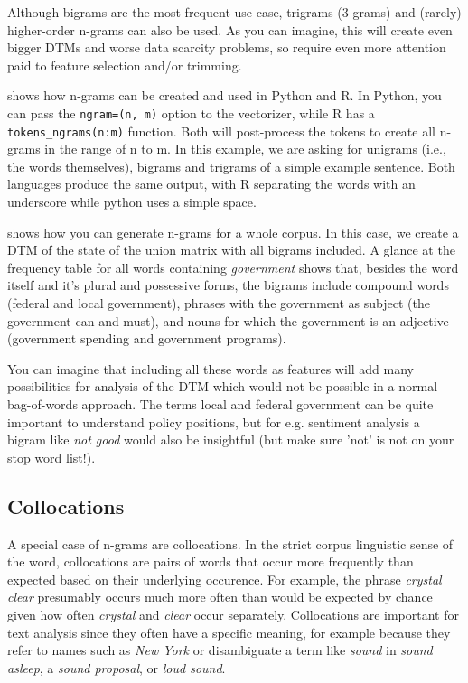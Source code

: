 Although bigrams are the most frequent use case, trigrams (3-grams) and (rarely) higher-order n-grams can also be used.
As you can imagine, this will create even bigger DTMs and worse data scarcity problems,
so require even more attention paid to feature selection and/or trimming.



 shows how n-grams can be created and used in Python and R.
In Python, you can pass the \verb|ngram=(n, m)| option to the vectorizer,
while R has a \verb|tokens_ngrams(n:m)| function.
Both will post-process the tokens to create all n-grams in the range of n to m.
In this example, we are asking for unigrams (i.e., the words themselves), bigrams and trigrams of a simple example sentence.
Both languages produce the same output, with R separating the words with an underscore while python uses a simple space.


 shows how you can generate n-grams for a whole corpus.
In this case, we create a DTM of the state of the union matrix with all bigrams included.
A glance at the frequency table for all words containing \emph{government} shows that,
besides the word itself and it's plural and possessive forms, the bigrams include compound words (federal and local government),
phrases with  the government as subject (the government can and must), and nouns for which the government is an adjective
(government spending and government programs).

You can imagine that including all these words as features will add many possibilities for analysis of the DTM
which would not be possible in a normal bag-of-words approach.
The terms local and federal government can be quite important to understand policy positions,
but for e.g. sentiment analysis a bigram like \emph{not good} would also be insightful
(but make sure 'not' is not on your stop word list!).   

\subsection{Collocations}

A special case of n-grams are collocations.
In the strict corpus linguistic sense of the word, collocations are pairs of words that occur more frequently than expected
based on their underlying occurence.
For example, the phrase \emph{crystal clear} presumably occurs much more often than would be expected by chance given
how often \emph{crystal} and \emph{clear} occur separately.
Collocations are important for text analysis since they often have a specific meaning,
for example because they refer to names such as \emph{New York} or disambiguate a term like \emph{sound} in \emph{sound asleep},
a \emph{sound proposal}, or \emph{loud sound}.

